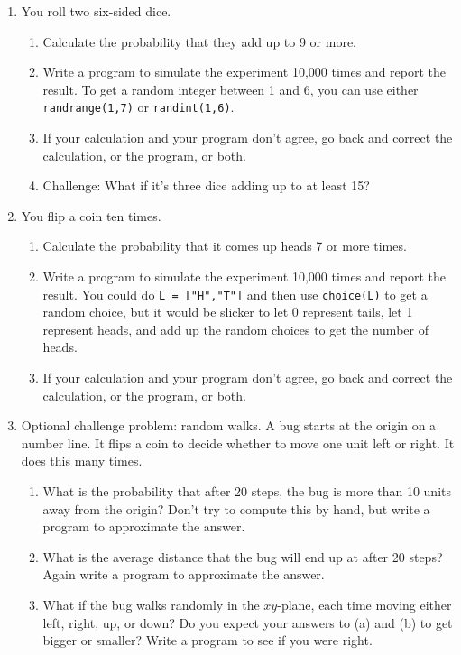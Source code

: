 \documentclass{article}
\begin{document}
\begin{enumerate}
\item You roll two six-sided dice.
\begin{enumerate}
\item Calculate the probability that they add up to 9 or more.
\item Write a program to simulate the experiment 10,000 times and report the result.  To get a random integer between 1 and 6, you can use either \verb|randrange(1,7)| or \verb|randint(1,6)|.
\item If your calculation and your program don't agree, go back and correct the calculation, or the program, or both.
\item Challenge: What if it's three dice adding up to at least 15?
\end{enumerate}

\item You flip a coin ten times.
\begin{enumerate}
\item Calculate the probability that it comes up heads 7 or more times.
\item Write a program to simulate the experiment 10,000 times and report the result.  You could do \verb|L = ["H","T"]| and then use \verb|choice(L)| to get a random choice, but it would be slicker to let 0 represent tails, let 1 represent heads, and add up the random choices to get the number of heads.
\item If your calculation and your program don't agree, go back and correct the calculation, or the program, or both.
\end{enumerate}

\item Optional challenge problem: random walks.  A bug starts at the origin on a number line.  It flips a coin to decide whether to move one unit left or right.  It does this many times.
\begin{enumerate}
\item What is the probability that after 20 steps, the bug is more than 10 units away from the origin?  Don't try to compute this by hand, but write a program to approximate the answer.
\item What is the average distance that the bug will end up at after 20 steps?  Again write a program to approximate the answer.
\item What if the bug walks randomly in the $xy$-plane, each time moving either left, right, up, or down?  Do you expect your answers to (a) and (b) to get bigger or smaller?  Write a program to see if you were right.
\end{enumerate}

\end{enumerate}
\end{document}
